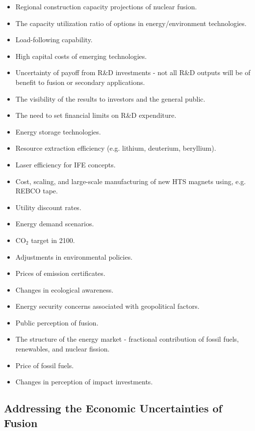 \begin{itemize}
\item Regional construction capacity projections of nuclear fusion.
 \item The capacity utilization ratio of options in energy/environment technologies.
 \item Load-following capability.
 \item High capital costs of emerging technologies.
 \item Uncertainty of payoff from R\&D investments - not all R\&D outputs will be of benefit to fusion or secondary applications.
 \item The visibility of the results to investors and the general public.
 \item The need to set financial limits on R\&D expenditure.
 \item Energy storage technologies.
 \item Resource extraction efficiency (e.g. lithium, deuterium, beryllium).
 \item Laser efficiency for IFE concepts.
 \item Cost, scaling, and large-scale manufacturing of new HTS magnets using, e.g. REBCO tape.
\end{itemize}
 

\begin{itemize}
\item Utility discount rates.
 \item Energy demand scenarios.
 \item CO$_2$ target in 2100.
 \item Adjustments in environmental policies.
 \item Prices of emission certificates.
 \item Changes in ecological awareness.
 \item Energy security concerns associated with geopolitical factors.
 \item Public perception of fusion.
 \item The structure of the energy market - fractional contribution of fossil fuels, renewables, and nuclear fission.
 \item Price of fossil fuels.
 \item Changes in perception of impact investments.
\end{itemize}
 

\subsection{Addressing the Economic Uncertainties of Fusion}

